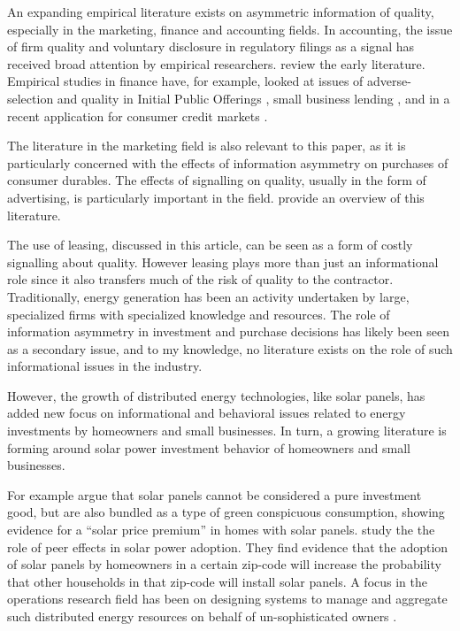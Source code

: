 \documentclass[a4paper]{article}
\begin{document}
An expanding empirical literature exists on asymmetric information of quality, especially in the marketing, finance and accounting fields. In accounting, the issue of firm quality and voluntary disclosure in regulatory filings as a signal has received broad attention by empirical researchers. \citet{healy_information_2001} review the early literature. Empirical studies in finance have, for example, looked at issues of adverse-selection and quality in Initial Public Offerings \citep{michaely_pricing_1994}, small business lending \citep{petersen_benefits_1994}, and in a recent application for consumer credit markets \citep{dobbie_information_2013}.

The literature in the marketing field is also relevant to this paper, as it is particularly concerned with the effects of information asymmetry on purchases of consumer durables. The effects of signalling on quality, usually in the form of advertising, is particularly important in the field. \citet{kirmani_no_2000} provide an overview of this literature.

The use of leasing, discussed in this article, can be seen as a form of costly signalling about quality. However leasing plays more than just an informational role since it also transfers much of the risk of quality to the contractor. Traditionally, energy generation has been an activity undertaken by large, specialized firms with specialized knowledge and resources. The role of information asymmetry in investment and purchase decisions has likely been seen as a secondary issue, and to my knowledge, no literature exists on the role of such informational issues in the industry.

However, the growth of distributed energy technologies, like solar panels, has added new focus on informational and behavioral issues related to energy investments by homeowners and small businesses. In turn, a growing literature is forming around solar power investment behavior of homeowners and small businesses.

For example \citet{dastrup_understanding_2012} argue that solar panels cannot be considered a pure investment good, but are also bundled as a type of green conspicuous consumption, showing evidence for a ``solar price premium'' in homes with solar panels. \citet{bollinger_peer_2012} study the the role of peer effects in solar power adoption. They find evidence that the adoption of solar panels by homeowners in a certain zip-code will increase the probability that other households in that zip-code will install solar panels. A focus in the operations research field has been on designing systems to manage and aggregate such distributed energy resources on behalf of un-sophisticated owners \citep{velik_energy_2016, le_cadre_gametheoretic_2019}.
\end{document}
